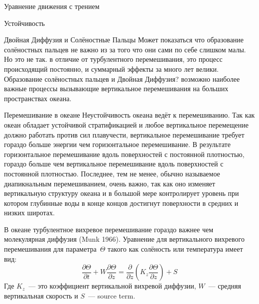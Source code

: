\begin{chapter}{Уравнение движения с трением}
\begin{section}{Устойчивость}
\begin{paragraph}{Двойная Диффузия и Солёностные Пальцы}
Может показаться что образование солёностных пальцев не важно из за
того что они сами по себе слишком малы. Но это не так. в отличие от
турбулентного перемешивания, это процесс происходящий постоянно, и
суммарный эффекты за много лет велики. Образование солёностных пальцев
и Двойная Диффузия? возможно наиболее важные процессы вызывающие
вертикальное перемешивания на больших пространствах океана.

\end{paragraph}
\end{section}

\begin{section}{Перемешивание в океане}
Неустойчивость океана ведёт к перемешиванию. Так как океан обладает
устойчивой стратификацией и любое вертикальное перемещение должно
работать против сил плавучести, вертикальное перемешивание требует
гораздо больше энергии чем горизонтальное перемешивание. В результате
горизонтальное перемешивание вдоль поверхностей с постоянной
плотностью, гораздо больше чем вертикальное перемешивание вдоль
поверхностей с постоянной плотностью. Последнее, тем не менее, обычно
называемое диапикнальным перемешиванием, очень важно, так как оно
изменяет вертикальную структуру океана и в большой мере контролирует
уровень при котором глубинные воды в конце концов достигнут
поверхности в средних и низких широтах.

В океане турбулентное вихревое перемешивание гораздо важнее чем
молекулярная диффузия (Munk 1966). Уравнение для вертикального
вихревого перемешивания для параметра~$\Theta$ такого как солёность или
температура имеет вид:
\begin{equation}
\frac{\partial \Theta}{\partial t} + W \frac{\partial \Theta}{\partial z}
 = \frac{\partial}{\partial z} \left(K_z\frac{\partial \Theta}{\partial z}\right) + S
\end{equation}
Где $K_z$~--- это коэффициент вертикальной вихревой диффузии, $W$~---
средняя вертикальная скорость и $S$~--- source term.


\end{section}
\end{chapter}
